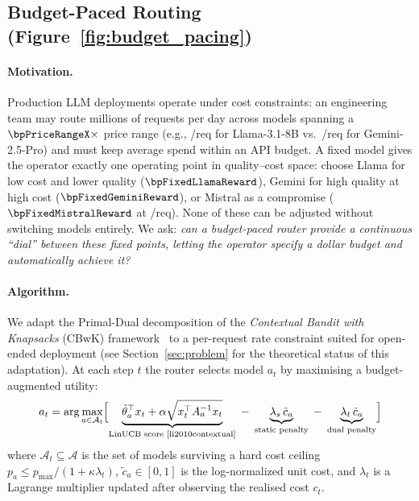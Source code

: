 
\subsection{Budget-Paced Routing (Figure~\ref{fig:budget_pacing})}
\label{sec:budget_pacing}

\paragraph{Motivation.}
Production LLM deployments operate under cost constraints:
an engineering team may route millions of requests per day across
models spanning a $\bpPriceRangeX\times$ price range
(e.g., \bpFixedLlamaCost/req for Llama-3.1-8B vs.\
\bpFixedGeminiCost/req for Gemini-2.5-Pro)
and must keep average spend within an API budget.
A fixed model gives the operator exactly one operating point
in quality--cost space: choose Llama for low cost and
lower quality ($\bpFixedLlamaReward$), Gemini for high quality
at high cost ($\bpFixedGeminiReward$), or Mistral as a
compromise ($\bpFixedMistralReward$ at \bpFixedMistralCost/req).
None of these can be adjusted without switching models entirely.
We ask: \emph{can a budget-paced router provide a continuous
``dial'' between these fixed points, letting the operator
specify a dollar budget and automatically achieve it?}

\paragraph{Algorithm.}
We adapt the Primal-Dual decomposition of the \emph{Contextual Bandit with Knapsacks}
(CBwK) framework~\cite{agrawal2016linear} to a per-request rate constraint suited for open-ended deployment (see Section~\ref{sec:problem} for the theoretical status of this adaptation).
At each step $t$ the router selects model $a_t$ by maximising a
budget-augmented utility:
\begin{equation}
    a_t = \arg\max_{a \in \mathcal{A}_t} \Bigl[
        \underbrace{\hat\theta_a^\top x_t + \alpha \sqrt{x_t^\top A_a^{-1} x_t}}_{\text{LinUCB score~\cite{li2010contextual}}}
        \;-\; \underbrace{\lambda_s \,\tilde{c}_a}_{\text{static penalty}}
        \;-\; \underbrace{\lambda_t \,\tilde{c}_a}_{\text{dual penalty}}
    \Bigr]
    \label{eq:budget_ucb}
\end{equation}
where $\mathcal{A}_t \subseteq \mathcal{A}$ is the set of models
surviving a hard cost ceiling
$p_a \leq p_{\max}/(1 + \kappa\lambda_t)$,
$\tilde{c}_a \in [0,1]$ is the log-normalized unit cost,
and $\lambda_t$ is a Lagrange multiplier updated after observing the
realised cost $c_t$.

